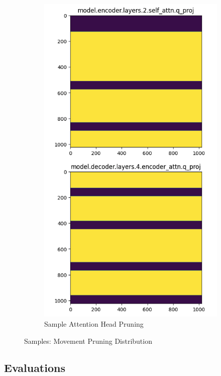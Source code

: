 \documentclass{article}
\begin{document}
\begin{figure}[h!]
\begin{subfigure}[b]{0.35\textwidth}
            \includegraphics[width=\textwidth]{pics/pa/pruning2}
            \caption{Sample Attention Head Pruning}
            \label{fig:subfig2}
        \end{subfigure}
        \caption{Samples: Movement Pruning Distribution}
        \label{fig:two_images_subcaption}
    \end{figure}

    \subsection{Evaluations}
\end{document}
